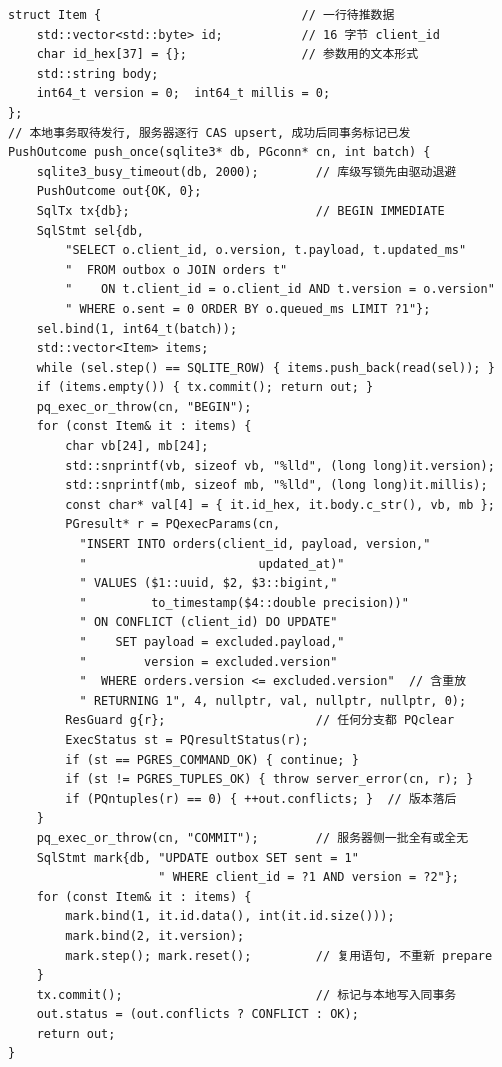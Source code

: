 \documentclass[12pt,a4paper,fontset=fandol]{ctexbook}
\begin{document}
\begin{lstlisting}[caption={C/C++：outbox 与服务器 upsert 的完整一批}]
struct Item {                            // 一行待推数据
    std::vector<std::byte> id;           // 16 字节 client_id
    char id_hex[37] = {};                // 参数用的文本形式
    std::string body;
    int64_t version = 0;  int64_t millis = 0;
};
// 本地事务取待发行, 服务器逐行 CAS upsert, 成功后同事务标记已发
PushOutcome push_once(sqlite3* db, PGconn* cn, int batch) {
    sqlite3_busy_timeout(db, 2000);        // 库级写锁先由驱动退避
    PushOutcome out{OK, 0};
    SqlTx tx{db};                          // BEGIN IMMEDIATE
    SqlStmt sel{db,
        "SELECT o.client_id, o.version, t.payload, t.updated_ms"
        "  FROM outbox o JOIN orders t"
        "    ON t.client_id = o.client_id AND t.version = o.version"
        " WHERE o.sent = 0 ORDER BY o.queued_ms LIMIT ?1"};
    sel.bind(1, int64_t(batch));
    std::vector<Item> items;
    while (sel.step() == SQLITE_ROW) { items.push_back(read(sel)); }
    if (items.empty()) { tx.commit(); return out; }
    pq_exec_or_throw(cn, "BEGIN");
    for (const Item& it : items) {
        char vb[24], mb[24];
        std::snprintf(vb, sizeof vb, "%lld", (long long)it.version);
        std::snprintf(mb, sizeof mb, "%lld", (long long)it.millis);
        const char* val[4] = { it.id_hex, it.body.c_str(), vb, mb };
        PGresult* r = PQexecParams(cn,
          "INSERT INTO orders(client_id, payload, version,"
          "                        updated_at)"
          " VALUES ($1::uuid, $2, $3::bigint,"
          "         to_timestamp($4::double precision))"
          " ON CONFLICT (client_id) DO UPDATE"
          "    SET payload = excluded.payload,"
          "        version = excluded.version"
          "  WHERE orders.version <= excluded.version"  // 含重放
          " RETURNING 1", 4, nullptr, val, nullptr, nullptr, 0);
        ResGuard g{r};                     // 任何分支都 PQclear
        ExecStatus st = PQresultStatus(r);
        if (st == PGRES_COMMAND_OK) { continue; }
        if (st != PGRES_TUPLES_OK) { throw server_error(cn, r); }
        if (PQntuples(r) == 0) { ++out.conflicts; }  // 版本落后
    }
    pq_exec_or_throw(cn, "COMMIT");        // 服务器侧一批全有或全无
    SqlStmt mark{db, "UPDATE outbox SET sent = 1"
                     " WHERE client_id = ?1 AND version = ?2"};
    for (const Item& it : items) {
        mark.bind(1, it.id.data(), int(it.id.size()));
        mark.bind(2, it.version);
        mark.step(); mark.reset();         // 复用语句, 不重新 prepare
    }
    tx.commit();                           // 标记与本地写入同事务
    out.status = (out.conflicts ? CONFLICT : OK);
    return out;
}
\end{lstlisting}
\end{document}
